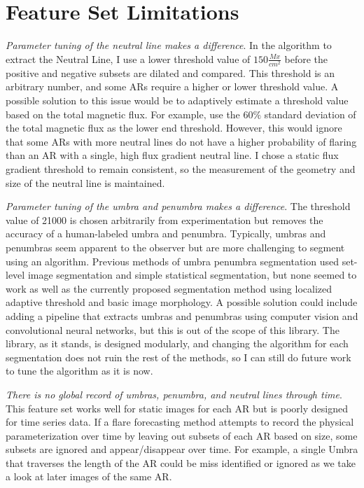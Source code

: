 \section{Feature Set Limitations} \label{sec:limitations}
\textit{Parameter tuning of the neutral line makes a difference}. In the algorithm to extract the Neutral Line, I use a lower threshold value of $150 \frac{Mx}{cm^2}$ before the positive and negative subsets are dilated and compared. This threshold is an arbitrary number, and some ARs require a higher or lower threshold value. A possible solution to this issue would be to adaptively estimate a threshold value based on the total magnetic flux. For example, use the $60\%$ standard deviation of the total magnetic flux as the lower end threshold. However, this would ignore that some ARs with more neutral lines do not have a higher probability of flaring than an AR with a single, high flux gradient neutral line. I chose a static flux gradient threshold to remain consistent, so the measurement of the geometry and size of the neutral line is maintained. 

\textit{Parameter tuning of the umbra and penumbra makes a difference}. The threshold value of 21000 is chosen arbitrarily from experimentation but removes the accuracy of a human-labeled umbra and penumbra. Typically, umbras and penumbras seem apparent to the observer but are more challenging to segment using an algorithm. Previous methods of umbra penumbra segmentation used set-level image segmentation and simple statistical segmentation, but none seemed to work as well as the currently proposed segmentation method using localized adaptive threshold and basic image morphology. A possible solution could include adding a pipeline that extracts umbras and penumbras using computer vision and convolutional neural networks, but this is out of the scope of this library. The library, as it stands, is designed modularly, and changing the algorithm for each segmentation does not ruin the rest of the methods, so I can still do future work to tune the algorithm as it is now.

\textit{There is no global record of umbras, penumbra, and neutral lines through time}. This feature set works well for static images for each AR but is poorly designed for time series data. If a flare forecasting method attempts to record the physical parameterization over time by leaving out subsets of each AR based on size, some subsets are ignored and appear/disappear over time. For example, a single Umbra that traverses the length of the AR could be miss identified or ignored as we take a look at later images of the same AR.